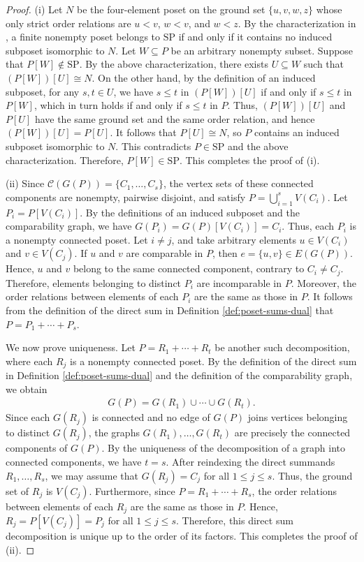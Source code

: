 \documentclass[11pt,a4paper]{article}
\begin{document}
\begin{proof}
\textup{(i)}
Let $N$ be the four-element poset on the ground set $\{u,v,w,z\}$
whose only strict order relations are $u<v$, $w<v$, and $w<z$.
By the characterization in \cite{Valdes1981},
a finite nonempty poset belongs to $\mathrm{SP}$ if and only if
it contains no induced subposet isomorphic to $N$.
Let $W\subseteq P$ be an arbitrary nonempty subset.
Suppose that $P[W]\notin\mathrm{SP}$.
By the above characterization, there exists $U\subseteq W$
such that $(P[W])[U]\cong N$.
On the other hand, by the definition of an induced subposet,
for any $s,t\in U$, we have $s\le t$ in $(P[W])[U]$
if and only if $s\le t$ in $P[W]$, which in turn holds
if and only if $s\le t$ in $P$.
Thus, $(P[W])[U]$ and $P[U]$ have the same ground set
and the same order relation, and hence $(P[W])[U]=P[U]$.
It follows that $P[U]\cong N$, so $P$ contains an induced subposet isomorphic to $N$.
This contradicts $P\in\mathrm{SP}$ and the above characterization.
Therefore, $P[W]\in\mathrm{SP}$.
This completes the proof of \textup{(i)}.

\textup{(ii)}
Since $\mathcal C(G(P))=\{C_1,\ldots,C_s\}$,
the vertex sets of these connected components are nonempty,
pairwise disjoint, and satisfy $P=\bigcup_{i=1}^{s}V(C_i)$.
Let $P_i=P[V(C_i)]$.
By the definitions of an induced subposet and the comparability graph,
we have $G(P_i)=G(P)[V(C_i)]=C_i$.
Thus, each $P_i$ is a nonempty connected poset.
Let $i\neq j$, and take arbitrary elements $u\in V(C_i)$ and $v\in V(C_j)$.
If $u$ and $v$ are comparable in $P$, then $e=\{u,v\}\in E(G(P))$.
Hence, $u$ and $v$ belong to the same connected component, contrary to $C_i\neq C_j$.
Therefore, elements belonging to distinct $P_i$ are incomparable in $P$.
Moreover, the order relations between elements of each $P_i$ are the same as those in $P$.
It follows from the definition of the direct sum 
in Definition \ref{def:poset-sums-dual} that $P=P_1+\cdots+P_s$.

We now prove uniqueness.
Let $P=R_1+\cdots+R_t$ be another such decomposition,
where each $R_j$ is a nonempty connected poset.
By the definition of the direct sum in Definition \ref{def:poset-sums-dual}
and the definition of the comparability graph, we obtain
\begin{eqnarray*}
G(P)=G(R_1)\cup\cdots\cup G(R_t).
\end{eqnarray*}
Since each $G(R_j)$ is connected and no edge of $G(P)$ joins vertices belonging to distinct $G(R_j)$,
the graphs $G(R_1),\ldots,G(R_t)$ are precisely the connected components of $G(P)$.
By the uniqueness of the decomposition of a graph into connected components, we have $t=s$.
After reindexing the direct summands $R_1,\ldots,R_s$,
we may assume that $G(R_j)=C_j$ for all $1\leq j\leq s$.
Thus, the ground set of $R_j$ is $V(C_j)$.
Furthermore, since $P=R_1+\cdots+R_s$,
the order relations between elements of each $R_j$ are the same as those in $P$.
Hence, $R_j=P[V(C_j)]=P_j$ for all $1\leq j\leq s$.
Therefore, this direct sum decomposition is unique up to the order of its factors.
This completes the proof of \textup{(ii)}.


\end{proof}
\end{document}
